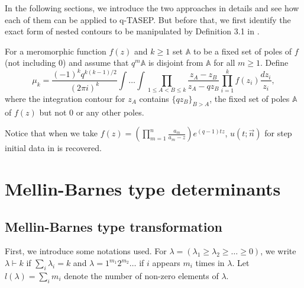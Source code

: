 In the following sections, we introduce the two approaches in details and see how each of them can be applied to q-TASEP. But before that, we first identify the exact form of nested contours to be manipulated by Definition 3.1 in \cite{macdonald2014}.

\begin{definition}
\label{mu_k_def}
For a meromorphic function $f(z)$ and $k \ge 1$ set $\mathbb{A}$ to be a fixed set of poles of $f$ (not including 0) and assume that $q^m \mathbb{A}$ is disjoint from $\mathbb{A}$ for all $m \ge 1$. Define
$$\mu_k = \frac{(-1)^k q^{k(k-1)/2}}{(2 \pi i)^k} \int \dots \int \prod_{1 \le A < B \le k} \frac{z_A - z_B} {z_A - qz_B} \prod_{i=1}^k f(z_i) \frac{dz_i}{z_i},$$ where the integration contour for $z_A$ contains $\{qz_B\}_{B > A}$, the fixed set of poles $\mathbb{A}$ of $f(z)$ but not $0$ or any other poles. 
\end{definition}

Notice that when we take $f(z) = \left( \prod_{m=1}^{n} \frac{a_m}{a_m - z} \right) e^{(q-1)tz}$, $u(t;\vec{n})$ for step initial data in  is recovered.

\section{Mellin-Barnes type determinants}

\subsection{Mellin-Barnes type transformation}
\label{m-b-type-transformation}
First, we introduce some notations used. For $\lambda = (\lambda_1 \ge \lambda_2 \ge \dots \ge 0)$, we write $\lambda \vdash k$ if $\sum_i \lambda_i = k$ and $\lambda = 1^{m_1} 2^{m_2} \dots$ if $i$ appears $m_i$ times in $\lambda$. Let $l(\lambda) = \sum_i m_i$ denote the number of non-zero elements of $\lambda$.\\

